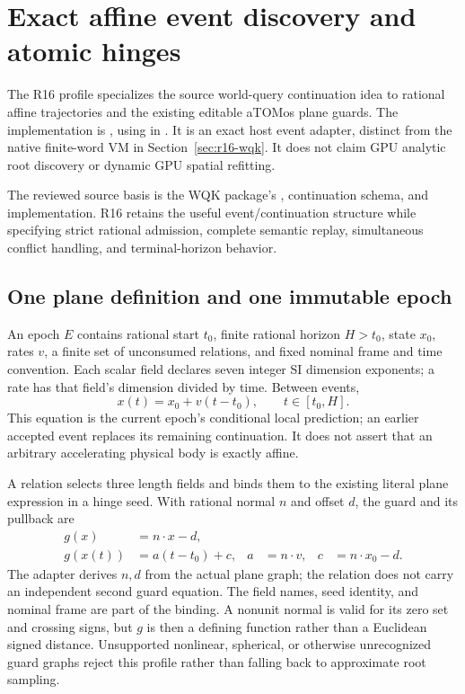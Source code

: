 \section{Exact affine event discovery and atomic hinges}
\label{sec:r16-events}

The R16 profile  specializes the
source world-query continuation idea to rational affine trajectories
and the existing editable aTOMos plane guards. The implementation is
, using
 in
. It is an exact host event adapter, distinct
from the native finite-word VM in Section~\ref{sec:r16-wqk}. It does
not claim GPU analytic root discovery or dynamic GPU spatial refitting.

The reviewed source basis is the WQK package's
, continuation schema,
and  implementation. R16 retains the
useful event/continuation structure while specifying strict rational
admission, complete semantic replay, simultaneous conflict handling,
and terminal-horizon behavior.

\subsection{One plane definition and one immutable epoch}

An epoch $E$ contains rational start $t_0$, finite rational horizon
$H>t_0$, state $x_0$, rates $v$, a finite set of unconsumed relations,
and fixed nominal frame and time convention. Each scalar field declares
seven integer SI dimension exponents; a rate has that field's dimension
divided by time. Between events,
\begin{equation}
 x(t)=x_0+v(t-t_0),\qquad t\in[t_0,H].
 \label{eq:r16-affine-epoch}
\end{equation}
This equation is the current epoch's conditional local prediction;
an earlier accepted event replaces its remaining continuation. It does
not assert that an arbitrary accelerating physical body is exactly affine.

A relation selects three length fields and binds them to the existing
literal plane expression in a hinge seed. With rational normal $n$
and offset $d$, the guard and its pullback are
\begin{align}
 g(x)&=n\cdot x-d,\nonumber\\
 g(x(t))&=a(t-t_0)+c,
 &a&=n\cdot v,&c&=n\cdot x_0-d.
 \label{eq:r16-affine-guard}
\end{align}
The adapter derives $n,d$ from the actual plane graph; the relation
does not carry an independent second guard equation. The field names,
seed identity, and nominal frame are part of the binding. A nonunit
normal is valid for its zero set and crossing signs, but $g$ is then
a defining function rather than a Euclidean signed distance. Unsupported
nonlinear, spherical, or otherwise unrecognized guard graphs reject
this profile rather than falling back to approximate root sampling.

